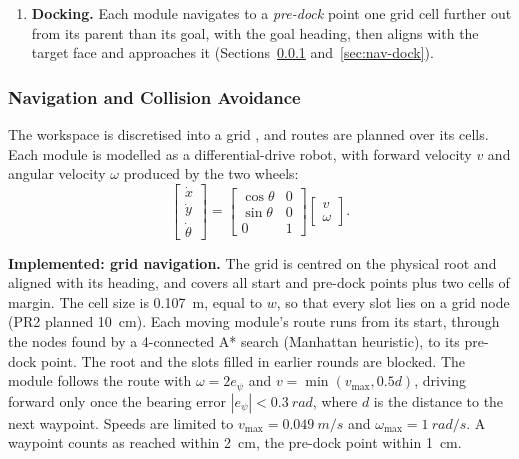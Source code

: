 \documentclass[12pt,a4paper]{article}
\begin{document}
\begin{enumerate}[topsep=2pt,itemsep=2pt,parsep=0pt,leftmargin=1.5em]
\item \textbf{Docking.} Each module navigates to a \emph{pre-dock} point one grid cell further out from its parent than its goal, with the goal heading, then aligns with the target face and approaches it (Sections~\ref{sec:nav-avoid} and~\ref{sec:nav-dock}).
\end{enumerate}

\subsubsection{Navigation and Collision Avoidance}
\label{sec:nav-avoid}

The workspace is discretised into a grid \cite{liu2023}, and routes are planned over its cells. Each module is modelled as a differential-drive robot, with forward velocity $v$ and angular velocity $\omega$ produced by the two wheels:
\begin{equation}
\begin{bmatrix} \dot{x} \\ \dot{y} \\ \dot{\theta} \end{bmatrix} =
\begin{bmatrix} \cos\theta & 0 \\ \sin\theta & 0 \\ 0 & 1 \end{bmatrix}
\begin{bmatrix} v \\ \omega \end{bmatrix}.
\end{equation}

\textbf{Implemented: grid navigation.} The grid is centred on the physical root and aligned with its heading, and covers all start and pre-dock points plus two cells of margin. The cell size is \SI{0.107}{m}, equal to $w$, so that every slot lies on a grid node (PR2 planned \SI{10}{cm}). Each moving module's route runs from its start, through the nodes found by a 4-connected A* search (Manhattan heuristic), to its pre-dock point. The root and the slots filled in earlier rounds are blocked. The module follows the route with $\omega = 2e_\psi$ and $v = \min(v_\text{max}, 0.5d)$, driving forward only once the bearing error $|e_\psi| < \SI{0.3}{rad}$, where $d$ is the distance to the next waypoint. Speeds are limited to $v_\text{max} = \SI{0.049}{m/s}$ and $\omega_\text{max} = \SI{1}{rad/s}$. A waypoint counts as reached within \SI{2}{cm}, the pre-dock point within \SI{1}{cm}.
\end{document}
